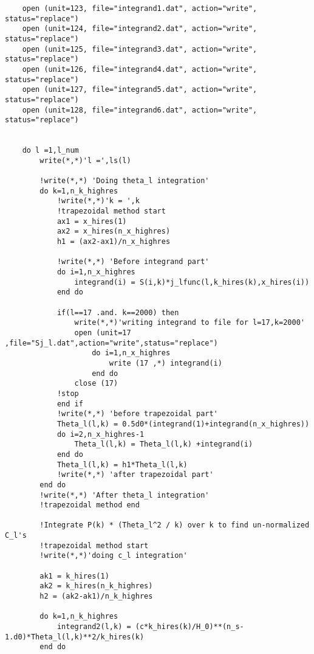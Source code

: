 \documentclass[a4paper]{report}
\begin{document}
\begin{verbatim}
    open (unit=123, file="integrand1.dat", action="write", status="replace")
    open (unit=124, file="integrand2.dat", action="write", status="replace")
    open (unit=125, file="integrand3.dat", action="write", status="replace")
    open (unit=126, file="integrand4.dat", action="write", status="replace")
    open (unit=127, file="integrand5.dat", action="write", status="replace")
    open (unit=128, file="integrand6.dat", action="write", status="replace")


    do l =1,l_num
        write(*,*)'l =',ls(l)

        !write(*,*) 'Doing theta_l integration'
        do k=1,n_k_highres
            !write(*,*)'k = ',k
            !trapezoidal method start
            ax1 = x_hires(1)
            ax2 = x_hires(n_x_highres)
            h1 = (ax2-ax1)/n_x_highres

            !write(*,*) 'Before integrand part'
            do i=1,n_x_highres
                integrand(i) = S(i,k)*j_lfunc(l,k_hires(k),x_hires(i))
            end do

            if(l==17 .and. k==2000) then
                write(*,*)'writing integrand to file for l=17,k=2000'
                open (unit=17 ,file="Sj_l.dat",action="write",status="replace")
                    do i=1,n_x_highres
                        write (17 ,*) integrand(i)
                    end do 
                close (17)
            !stop
            end if
            !write(*,*) 'before trapezoidal part'
            Theta_l(l,k) = 0.5d0*(integrand(1)+integrand(n_x_highres))
            do i=2,n_x_highres-1
                Theta_l(l,k) = Theta_l(l,k) +integrand(i)
            end do
            Theta_l(l,k) = h1*Theta_l(l,k)
            !write(*,*) 'after trapezoidal part'
        end do
        !write(*,*) 'After theta_l integration'
        !trapezoidal method end

        !Integrate P(k) * (Theta_l^2 / k) over k to find un-normalized C_l's
        !trapezoidal method start
        !write(*,*)'doing c_l integration'

        ak1 = k_hires(1)
        ak2 = k_hires(n_k_highres)
        h2 = (ak2-ak1)/n_k_highres

        do k=1,n_k_highres
            integrand2(l,k) = (c*k_hires(k)/H_0)**(n_s-1.d0)*Theta_l(l,k)**2/k_hires(k)
        end do



\end{verbatim}
\end{document}
